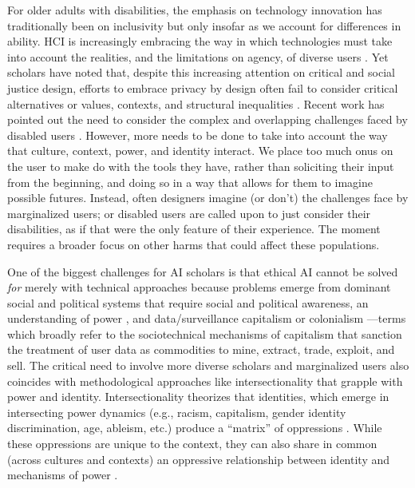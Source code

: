 \documentclass[11pt,dvipdfm]{article}
\begin{document}
For older adults with disabilities, the emphasis on technology innovation has traditionally been on inclusivity \cite{15,41,42}
but only insofar as we account for differences in ability. HCI is increasingly embracing the way in which technologies must take into account the realities, and the limitations on agency, of diverse users \cite{37,39,54}. Yet scholars have noted that, despite this increasing attention on critical and social justice design, efforts to embrace privacy by design often fail to consider critical alternatives or values, contexts, and structural inequalities \cite{57}. Recent work has pointed out the need to consider the complex and overlapping challenges faced by disabled users \cite{17}. However, more needs to be done to take into account the way that culture, context, power, and identity interact. We place too much onus on the user to make do with the tools they have, rather than soliciting their input from the beginning, and doing so in a way that allows for them to imagine possible futures.  Instead, often designers imagine (or don’t) the challenges face by marginalized users; or disabled users are called upon to just consider their disabilities, as if that were the only feature of their experience. The moment requires a broader focus on other harms that could affect these populations.

One of the biggest challenges for AI scholars is that ethical AI cannot be solved \emph{for} merely with technical approaches \cite{23,56,61} because problems emerge from dominant social and political systems that require social and political awareness, an understanding of power \cite{61}, and data/surveillance capitalism \cite{58,59} or colonialism \cite{12}---terms which broadly refer to the sociotechnical mechanisms of capitalism that sanction the treatment of user data as commodities to mine, extract, trade, exploit, and sell. The critical need to involve more diverse scholars and marginalized users also coincides with methodological approaches like intersectionality that grapple with power and identity. Intersectionality theorizes that identities, which emerge in intersecting power dynamics (e.g., racism, capitalism, gender identity discrimination, age, ableism, etc.) produce a ``matrix'' of oppressions \cite{7}. While these oppressions are unique to the context, they can also share in common (across cultures and contexts) an oppressive relationship between identity and mechanisms of power \cite{8}. 
\end{document}
